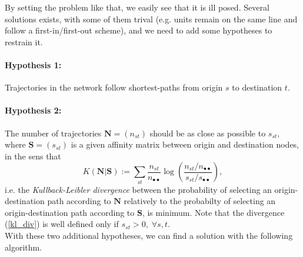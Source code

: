 \documentclass[11p]{article}
\begin{document}
By setting the problem like that, we easily see that it is ill posed. Several solutions exists, with some of them trival (e.g. units remain on the same line and follow a first-in/first-out scheme), and we need to add some hypotheses to restrain it.

\paragraph{Hypothesis 1:} Trajectories in the network follow shortest-paths from origin $s$ to destination $t$. \\

\paragraph{Hypothesis 2:} The number of trajectories $\mathbf{N} = (n_{st})$ should be as close as possible to $s_{st}$, where $\mathbf{S} = (s_{st})$ is a given affinity matrix between origin and destination nodes, in the sens that
\begin{equation}
	K(\mathbf{N} | \mathbf{S}) := \sum_{st} \frac{n_{st}}{n_{\bullet \bullet}} \log \left( \frac{n_{st}/n_{\bullet \bullet}}{s_{st} / s_{\bullet \bullet}} \right), \label{kl_div}
\end{equation}
i.e. the \emph{Kullback-Leibler divergence} between the probability of selecting an origin-destination path according to $\mathbf{N}$ relatively to the probabilty of selecting an origin-destination path according to $\mathbf{S}$, is minimum. Note that the divergence (\ref{kl_div}) is well defined only if $s_{st} > 0, \; \forall s, t$. \\

With these two additional hypotheses, we can find a solution with the following algorithm.
\end{document}
